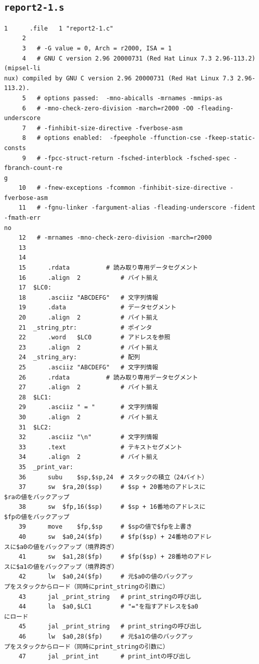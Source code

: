 \subsection{\texttt{report2-1.s}} \label{sec:report2-1.s}
\begin{Verbatim}[fontsize=\small, baselinestretch=0.8]
     1		.file	1 "report2-1.c"
     2	
     3	 # -G value = 0, Arch = r2000, ISA = 1
     4	 # GNU C version 2.96 20000731 (Red Hat Linux 7.3 2.96-113.2) (mipsel-li
nux) compiled by GNU C version 2.96 20000731 (Red Hat Linux 7.3 2.96-113.2).
     5	 # options passed:  -mno-abicalls -mrnames -mmips-as
     6	 # -mno-check-zero-division -march=r2000 -O0 -fleading-underscore
     7	 # -finhibit-size-directive -fverbose-asm
     8	 # options enabled:  -fpeephole -ffunction-cse -fkeep-static-consts
     9	 # -fpcc-struct-return -fsched-interblock -fsched-spec -fbranch-count-re
g
    10	 # -fnew-exceptions -fcommon -finhibit-size-directive -fverbose-asm
    11	 # -fgnu-linker -fargument-alias -fleading-underscore -fident -fmath-err
no
    12	 # -mrnames -mno-check-zero-division -march=r2000
    13	
    14	
    15		.rdata			# 読み取り専用データセグメント
    16		.align	2			# バイト揃え
    17	$LC0:
    18		.asciiz	"ABCDEFG"	# 文字列情報
    19		.data				# データセグメント
    20		.align	2			# バイト揃え
    21	_string_ptr:			# ポインタ
    22		.word	$LC0		# アドレスを参照
    23		.align	2			# バイト揃え
    24	_string_ary:			# 配列
    25		.asciiz	"ABCDEFG"	# 文字列情報
    26		.rdata			# 読み取り専用データセグメント
    27		.align	2			# バイト揃え
    28	$LC1:
    29		.asciiz	" = "		# 文字列情報
    30		.align	2			# バイト揃え
    31	$LC2:
    32		.asciiz	"\n"		# 文字列情報
    33		.text				# テキストセグメント
    34		.align	2			# バイト揃え
    35	_print_var:
    36		subu	$sp,$sp,24	# スタックの積立（24バイト）
    37		sw	$ra,20($sp)		# $sp + 20番地のアドレスに
$raの値をバックアップ
    38		sw	$fp,16($sp)		# $sp + 16番地のアドレスに
$fpの値をバックアップ
    39		move	$fp,$sp		# $spの値で$fpを上書き
    40		sw	$a0,24($fp)		# $fp($sp) + 24番地のアドレ
スに$a0の値をバックアップ（境界跨ぎ）
    41		sw	$a1,28($fp)		# $fp($sp) + 28番地のアドレ
スに$a1の値をバックアップ（境界跨ぎ）
    42		lw	$a0,24($fp)		# 元$a0の値のバックアッ
プをスタックからロード（同時にprint_stringの引数に）
    43		jal	_print_string	# print_stringの呼び出し
    44		la	$a0,$LC1		# "="を指すアドレスを$a0
にロード
    45		jal	_print_string	# print_stringの呼び出し
    46		lw	$a0,28($fp)		# 元$a1の値のバックアッ
プをスタックからロード（同時にprint_stringの引数に）
    47		jal	_print_int		# print_intの呼び出し

\end{Verbatim}
